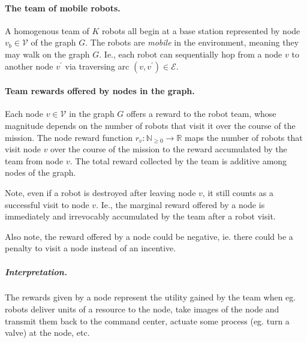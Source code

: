\documentclass[11pt, oneside]{article}
\begin{document}
\paragraph{The team of mobile robots.}
A homogenous team of $K$ robots all begin at a base station represented by node $v_b \in \mathcal{V}$ of the graph $G$. The robots are \emph{mobile} in the environment, meaning they may walk on the graph $G$.
Ie., each robot can sequentially hop from a node $v$ to another node $v^\prime$ via traversing arc $(v, v^\prime)\in\mathcal{E}$.

\paragraph{Team rewards offered by nodes in the graph.}
Each node $v\in \mathcal{V}$ in the graph $G$ offers a reward to the robot team, whose magnitude depends on the number of robots that visit it over the course of the mission. 
The node reward function $r_v: \mathbb{N}_{\geq 0} \rightarrow \mathbb{R}$ maps 
the number of robots that visit node $v$ over the course of the mission
 to 
 the reward accumulated by the team from node $v$.
 The total reward collected by the team is additive among nodes of the graph.
 
Note, even if a robot is destroyed after leaving node $v$, it still counts as a successful visit to node $v$.
Ie., the marginal reward offered by a node is immediately and irrevocably accumulated by the team after a robot visit.

Also note, the reward offered by a node could be negative, ie. there could be a penalty to visit a node instead of an incentive.

\vspace{-\baselineskip}
\subparagraph{Interpretation.} The rewards given by a node represent the utility gained by the team when eg. robots deliver units of a resource to the node, take images of the node and transmit them back to the command center, actuate some process (eg. turn a valve) at the node, etc. 
\end{document}
